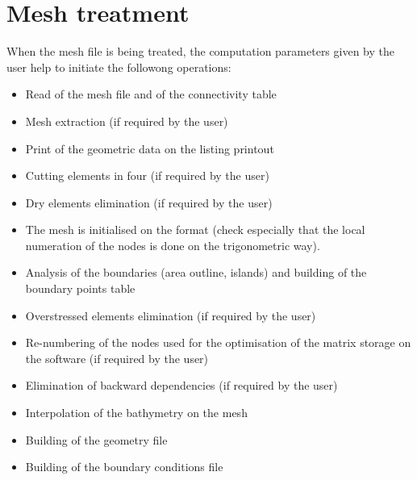 \chapter{Mesh treatment}
When the mesh file is being treated, the computation parameters given by the
user help \stbtel to initiate the followong operations:
\begin{itemize}
\item Read of the mesh file and of the connectivity table
\item Mesh extraction (if required by the user)
\item Print of the geometric data on the listing printout
\item Cutting elements in four (if required by the user)
\item Dry elements elimination (if required by the user)
\item The mesh is initialised on the \telemacsystem format (\stbtel check
especially that the local numeration of the nodes is done on the trigonometric
way).
\item Analysis of the boundaries (area outline, islands) and building of the
boundary points table
\item Overstressed elements elimination (if required by the user)
\item Re-numbering of the nodes used for the optimisation of the matrix storage
on the  software (if required by the user)
\item Elimination of backward dependencies (if required by the user)
\item Interpolation of the bathymetry on the mesh
\item Building of the geometry file
\item Building of the boundary conditions file
\end{itemize}

